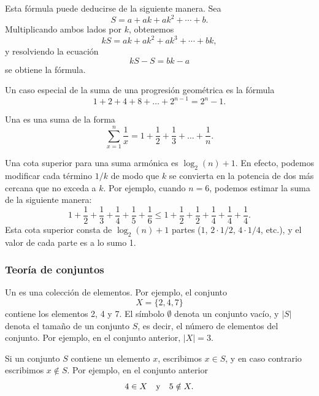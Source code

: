 Esta fórmula puede deducirse de la siguiente manera. Sea
\[ S = a + ak + ak^2 + \cdots + b .\]
Multiplicando ambos lados por $k$, obtenemos
\[ kS = ak + ak^2 + ak^3 + \cdots + bk,\]
y resolviendo la ecuación
\[ kS-S = bk-a\]
se obtiene la fórmula.

Un caso especial de la suma de una progresión geométrica es la fórmula
\[1+2+4+8+\ldots+2^{n-1}=2^n-1.\]


Una  es una suma de la forma
\[ \sum_{x=1}^n \frac{1}{x} = 1+\frac{1}{2}+\frac{1}{3}+\ldots+\frac{1}{n}.\]

Una cota superior para una suma armónica es $\log_2(n)+1$.
En efecto, podemos
modificar cada término $1/k$ de modo que $k$ se convierta
en la potencia de dos más cercana que no exceda a $k$.
Por ejemplo, cuando $n=6$, podemos estimar
la suma de la siguiente manera:
\[ 1+\frac{1}{2}+\frac{1}{3}+\frac{1}{4}+\frac{1}{5}+\frac{1}{6} \le
1+\frac{1}{2}+\frac{1}{2}+\frac{1}{4}+\frac{1}{4}+\frac{1}{4}.\]
Esta cota superior consta de $\log_2(n)+1$ partes
($1$, $2 \cdot 1/2$, $4 \cdot 1/4$, etc.),
y el valor de cada parte es a lo sumo 1.

\subsubsection{Teoría de conjuntos}


Un  es una colección de elementos.
Por ejemplo, el conjunto
\[X=\{2,4,7\}\]
contiene los elementos 2, 4 y 7.
El símbolo $\emptyset$ denota un conjunto vacío,
y $|S|$ denota el tamaño de un conjunto $S$,
es decir, el número de elementos del conjunto.
Por ejemplo, en el conjunto anterior, $|X|=3$.

Si un conjunto $S$ contiene un elemento $x$,
escribimos $x \in S$,
y en caso contrario escribimos $x \notin S$.
Por ejemplo, en el conjunto anterior
\[4 \in X \hspace{10px}\textrm{y}\hspace{10px} 5 \notin X.\]

